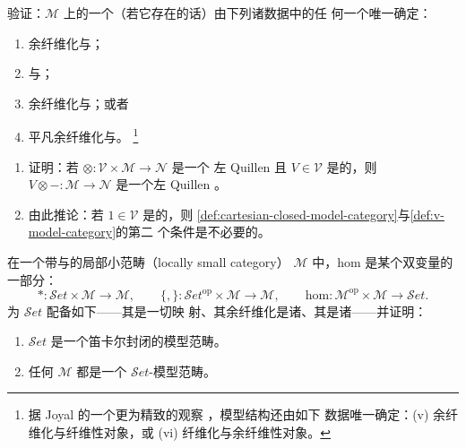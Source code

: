 \begin{exercise}\label{ex:model-structure-determined}
验证：$\mathcal{M}$ 上的一个\trModelStructure（若它存在的话）由下列诸数据中的任
何一个唯一确定：
\begin{enumerate}[label=(\roman*)]
\item 余纤维化与\trWeakEquivalence；
\item \trFibration{}与\trWeakEquivalence；
\item 余纤维化与\trFibration；或者
\item 平凡余纤维化与\trTrivialFibration。%
  \footnote{据 Joyal 的一个更为精致的观察 \cite[E.1.10]{bib63}，模型结构还由如下
  数据唯一确定：(v) 余纤维化与纤维性对象，或 (vi) 纤维化与余纤维性对象。}
\end{enumerate}
\end{exercise}

\begin{exercise}\label{ex:quillen-bifunctor-component}
\begin{enumerate}[label=(\roman*)]
\item 证明：若 $\otimes\colon\mathcal{V}\times\mathcal{M}\to\mathcal{N}$ 是一个
  左 Quillen \trBifunctor{}且 $V\in\mathcal{V}$ 是\trCofibrant{}的，则
  $V\otimes-\colon\mathcal{M}\to\mathcal{N}$ 是一个左 Quillen \trFunctor。
\item 由此推论：若 $1\in\mathcal{V}$ 是\trCofibrant{}的，则%
  \cref{def:cartesian-closed-model-category}与\cref{def:v-model-category}的第二
  个条件是不必要的。
\end{enumerate}
\end{exercise}

\begin{exercise}\label{ex:set-model-category}
在一个带\trProduct{}与\trCoproduct{}的局部小范畴（locally small category）
$\mathcal{M}$ 中，hom \trBifunctor{}是某个双变量\trAdjunction{}的一部分：
\[ \ast\colon\mathcal{S}et\times\mathcal{M}\to\mathcal{M},\qquad
   \{,\}\colon\mathcal{S}et^{\mathrm{op}}\times\mathcal{M}\to\mathcal{M},\qquad
   \mathrm{hom}\colon\mathcal{M}^{\mathrm{op}}\times\mathcal{M}\to\mathcal{S}et. \]
为 $\mathcal{S}et$ 配备如下\trModelStructure——其\trWeakEquivalence{}是一切映
射、其余纤维化是诸\trMonomorphism、其\trFibration{}是诸\trEpimorphism——并证明：
\begin{enumerate}[label=(\roman*)]
\item $\mathcal{S}et$ 是一个笛卡尔封闭的模型范畴。
\item 任何\trModelCategory{} $\mathcal{M}$ 都是一个 $\mathcal{S}et$-模型范畴。
\end{enumerate}
\end{exercise}

